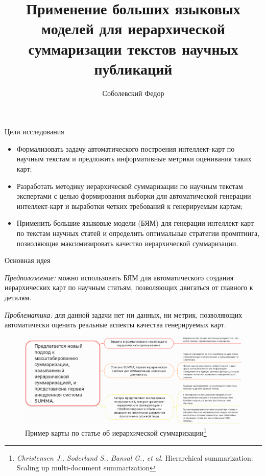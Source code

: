 \documentclass{beamer}
\title[\hbox to 56mm{Тензорное непрерывное представление сигнала}]{Применение больших языковых моделей для иерархической суммаризации текстов научных публикаций}
\author[Ф.\,А.~Соболевский]{Соболевский Федор}
\institute{Московский физико-технический институт}
\date{\footnotesize
\par\smallskip Кафедра интеллектуальных систем ФПМИ МФТИ
\par\smallskip\emph{Научный руководитель:} д.\,ф.-м.\,н. К.\,В.~Воронцов
\par\bigskip\small 2024}
\begin{document}

\begin{frame}
\thispagestyle{empty}
\maketitle
\end{frame}


\begin{frame}{Цели исследования}
\begin{itemize}
    \item Формализовать задачу автоматического построения интеллект-карт по научным текстам и предложить информативные метрики оценивания таких карт;
    
    \item Разработать методику иерархической суммаризации по научным текстам экспертами с целью формирования выборки для автоматической генерации интеллект-карт и выработки четких требований к генерируемым картам;
    
    \item Применить большие языковые модели (БЯМ) для генерации интеллект-карт по текстам научных статей и определить оптимальные стратегии промптинга, позволяющие максимизировать качество иерархической суммаризации.
\end{itemize}
\end{frame}


\begin{frame}{Основная идея}

\emph{Предположение:} можно использовать БЯМ для автоматического создания иерархических карт по научным статьям, позволяющих двигаться от главного к деталям. 

\emph{Проблематика:} для данной задачи нет ни данных, ни метрик, позволяющих автоматически оценить реальные аспекты качества генерируемых карт. 

\begin{figure}
    \centering
    \includegraphics[width=0.8\linewidth]{img/example_map.png}
    \caption{Пример карты по статье об иерархической суммаризации\footnote{
        \emph{Christensen J., Soderland S., Bansal G., et al.} Hierarchical summarization: Scaling up multi-document summarization}}
    \label{fig:example_map}
\end{figure}

\footnotetext{
    }

\end{frame}
\end{document}
